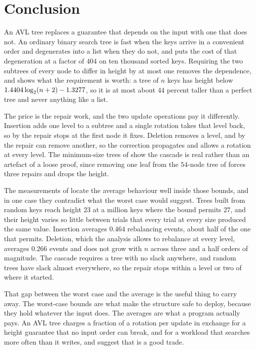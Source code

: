 \section{Conclusion}
\label{sec:conclusion}

An AVL tree replaces a guarantee that depends on the input with one that does
not. An ordinary binary search tree is fast when the keys arrive in a convenient
order and degenerates into a list when they do not, and 
puts the cost of that degeneration at a factor of $404$ on ten thousand sorted
keys. Requiring the two subtrees of every node to differ in height by at most one
removes the dependence, and  shows what the requirement is
worth: a tree of $n$ keys has height below $1.4404\log_{2}(n+2) - 1.3277$, so it is
at most about $44$ percent taller than a perfect tree and never anything like a
list.

The price is the repair work, and the two update operations pay it differently.
Insertion adds one level to a subtree and a single rotation takes that level
back, so by  the repair stops at the first node it fixes.
Deletion removes a level, and by  the repair can remove another,
so the correction propagates and  allows a rotation at
every level. The minimum-size trees of  show the cascade is real
rather than an artefact of a loose proof, since removing one leaf from the
$54$-node tree of  forces three repairs and drops the height.

The measurements of  locate the average behaviour well inside
those bounds, and in one case they contradict what the worst case would suggest.
Trees built from random keys reach height $23$ at a million keys where the bound
permits $27$, and their height varies so little between trials that every trial
at every size produced the same value. Insertion averages $0.464$ rebalancing
events, about half of the one that  permits. Deletion, which
the analysis allows to rebalance at every level, averages $0.266$ events and does
not grow with $n$ across three and a half orders of magnitude. The cascade
requires a tree with no slack anywhere, and random trees have slack almost
everywhere, so the repair stops within a level or two of where it started.

That gap between the worst case and the average is the useful thing to carry
away. The worst-case bounds are what make the structure safe to deploy, because
they hold whatever the input does. The averages are what a program actually pays.
An AVL tree charges a fraction of a rotation per update in exchange for a height
guarantee that no input order can break, and for a workload that searches more
often than it writes,  and  suggest
that is a good trade.
